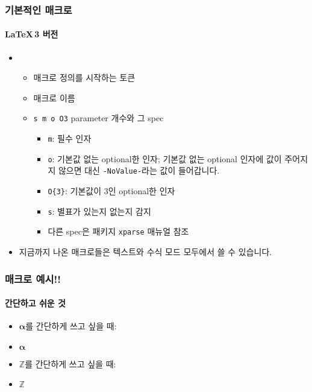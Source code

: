 \begin{frame}[fragile]
  \frametitle{기본적인 매크로}
  \framesubtitle{\LaTeX\,3 버전}
  \begin{itemize}
    \item \texttt{} 
    \begin{itemize}
      \item \texttt{\NewDocumentCommand} 매크로 정의를 시작하는 토큰
      \item \texttt{{\mymacro}} 매크로 이름
      \item \texttt{{s m o O{3}}} parameter 개수와 그 spec
      \begin{itemize}
        \item \texttt{m}: 필수 인자
        \item \texttt{o}: 기본값 없는 optional한 인자; 기본값 없는 optional 인자에 값이 주어지지 않으면 대신 \texttt{-NoValue-}라는 값이 들어갑니다.
        \item \texttt{O\{3\}}: 기본값이 3인 optional한 인자
        \item \texttt{s}: 별표가 있는지 없는지 감지
        \item 다른 spec은 패키지 \texttt{xparse} 매뉴얼 참조
      \end{itemize}
    \end{itemize}
    \item 지금까지 나온 매크로들은 텍스트와 수식 모드 모두에서 쓸 수 있습니다.
  \end{itemize}
\end{frame}

\begin{frame}[fragile]
  \frametitle{매크로 예시!!}
  \framesubtitle{간단하고 쉬운 것}
  \begin{itemize}
    \item $\boldsymbol{\alpha}$를 간단하게 쓰고 싶을 때:
    \item \texttt{\newcommand{\bsalpha}{\boldsymbol{\alpha}}} \newcommand{\bsalpha}{$\boldsymbol{\alpha}$} \bsalpha
    \item $\mathbb Z$를 간단하게 쓰고 싶을 때:
    \item \texttt{\newcommand{\ZZ}{\mathbb{Z}}} \newcommand{\ZZ}{{\mathbb Z}} $\ZZ$
  \end{itemize}
\end{frame}


